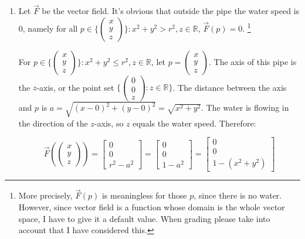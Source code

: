 \begin{exercise}{8}
  \begin{enumerate}
    \item Let $\vec{F}$ be the vector field. It's obvious that outside the pipe the water speed is 0, namely for all $p \in \{\begin{pmatrix}x\\y\\z\end{pmatrix}\} : x^2 + y^2 > r^2, z \in \mathbb{R}$, $\vec{F}(p) = 0$.
    \footnote{More precisely, $\vec{F}(p)$ is meaningless for those $p$, since there is no water. However, since vector field is a function whose domain is the whole vector space, I have to give it a default value. When grading please take into account that I have considered this.}
    
    For $p \in \{\begin{pmatrix}x\\y\\z\end{pmatrix}\} : x^2 + y^2 \leq r^2, z \in \mathbb{R}$, let $p = \begin{pmatrix}x\\y\\z\end{pmatrix}$. The axis of this pipe is the $z$-axis, or the point set $\{\begin{pmatrix}0\\0\\z\end{pmatrix} : z \in \mathbb{R}\}$. The distance between the axis and $p$ is $a = \sqrt{(x - 0)^2 + (y - 0)^2} = \sqrt{x^2 + y^2}$. The water is flowing in the direction of the $z$-axis, so $z$ equals the water speed. Therefore:
    
    $$\vec{F}(\begin{pmatrix}x\\y\\z\end{pmatrix}) =
      \begin{bmatrix}0\\0\\r^2 - a^2\end{bmatrix} =
      \begin{bmatrix}0\\0\\1 - a^2\end{bmatrix} =
      \begin{bmatrix}0\\0\\1 - (x^2 + y^2)\end{bmatrix}$$
    

\end{enumerate}
\end{exercise}

